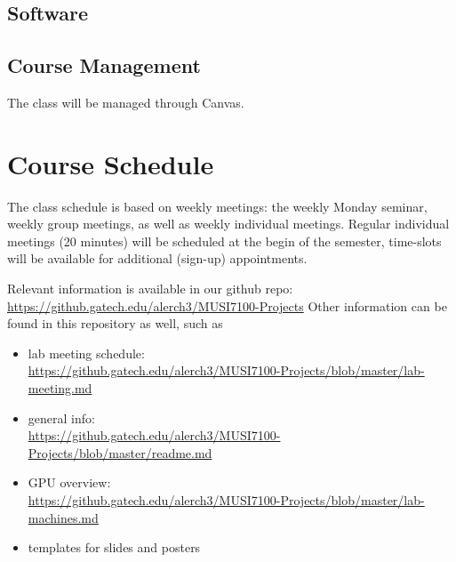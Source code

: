 \documentclass[letterpaper,oneside,10pt]{scrartcl}
\begin{document}
        \subsection{Software}
             
            
        \subsection{Course Management}
            The class will be managed through Canvas.
            
\section{Course Schedule}
    The class schedule is based on weekly meetings: the weekly Monday seminar, weekly group meetings, as well as weekly individual meetings. Regular individual meetings (20 minutes) will be scheduled at the begin of the semester, time-slots will be available for additional (sign-up) appointments.
    
    Relevant information is available in our github repo: \url{https://github.gatech.edu/alerch3/MUSI7100-Projects}
    Other information can be found in this repository as well, such as
    \begin{itemize}
        \item   lab meeting schedule:\\ \url{https://github.gatech.edu/alerch3/MUSI7100-Projects/blob/master/lab-meeting.md}
        \item   general info:\\ \url{https://github.gatech.edu/alerch3/MUSI7100-Projects/blob/master/readme.md}
        \item   GPU overview:\\ \url{https://github.gatech.edu/alerch3/MUSI7100-Projects/blob/master/lab-machines.md}
        \item   templates for slides and posters
    \end{itemize}
    
\end{document}
